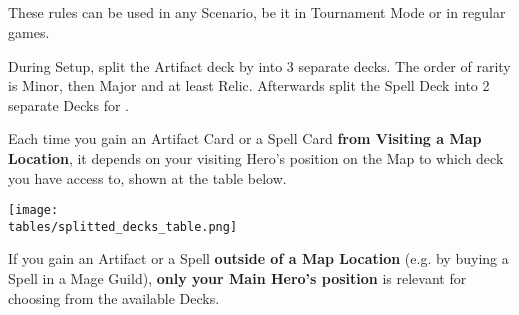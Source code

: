 \begin{multicols*}{2}
\subsection*{}

These rules can be used in any Scenario, be it in Tournament Mode or in regular games.

During Setup, split the Artifact deck by  into 3 separate decks.
The order of rarity is Minor, then Major and at least Relic.
Afterwards split the Spell Deck into 2 separate Decks for .

Each time you gain an Artifact Card or a Spell Card \textbf{from Visiting a Map Location}, it depends on your visiting Hero's position on the Map to which deck you have access to, shown at the table below.

\texttt{[image: \\tables/splitted\_decks\_table.png]}

If you gain an Artifact or a Spell \textbf{outside of a Map Location} (e.g. by buying a Spell in a Mage Guild), \textbf{only your Main Hero's position} is relevant for choosing from the available Decks.

\end{multicols*}
